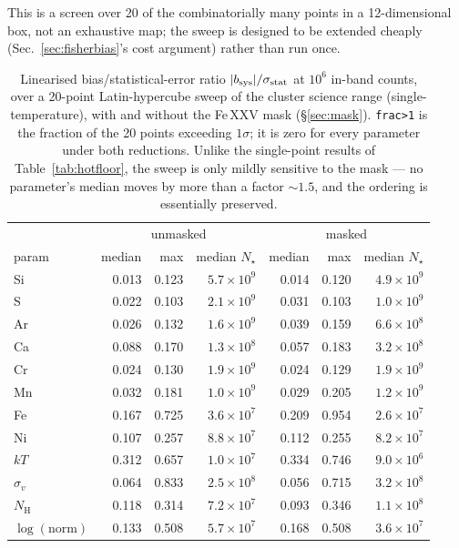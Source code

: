 \documentclass[11pt,a4paper]{article}
\newcommand{\nh}{N_{\mathrm{H}}}
\newcommand{\code}[1]{\texttt{#1}}
\begin{document}
This is a screen over 20 of the combinatorially many points in a 12-dimensional
box, not an exhaustive map; the sweep is designed to be extended cheaply
(Sec.~\ref{sec:fisherbias}'s cost argument) rather than run once.

\begin{table}[t]
\centering
\caption{Linearised bias/statistical-error ratio $|b_{\rm sys}|/\sigma_{\rm
stat}$ at $10^{6}$ in-band counts, over a 20-point Latin-hypercube sweep of
the cluster science range (single-temperature), with and without the Fe\,XXV
mask (\S\ref{sec:mask}). \code{frac>1} is the fraction of the 20 points
exceeding $1\sigma$; it is zero for every parameter under both reductions.
Unlike the single-point results of Table~\ref{tab:hotfloor}, the sweep is only
mildly sensitive to the mask --- no parameter's median moves by more than a
factor ${\sim}1.5$, and the ordering is essentially preserved.}
\label{tab:biassweep}
\begin{tabular}{lrrr|rrr}
\toprule
& \multicolumn{3}{c|}{unmasked} & \multicolumn{3}{c}{masked} \\
param & median & max & median $N_\star$ & median & max & median $N_\star$ \\
\midrule
Si       & 0.013 & 0.123 & $5.7\times10^{9}$ & 0.014 & 0.120 & $4.9\times10^{9}$ \\
S        & 0.022 & 0.103 & $2.1\times10^{9}$ & 0.031 & 0.103 & $1.0\times10^{9}$ \\
Ar       & 0.026 & 0.132 & $1.6\times10^{9}$ & 0.039 & 0.159 & $6.6\times10^{8}$ \\
Ca       & 0.088 & 0.170 & $1.3\times10^{8}$ & 0.057 & 0.183 & $3.2\times10^{8}$ \\
Cr       & 0.024 & 0.130 & $1.9\times10^{9}$ & 0.024 & 0.129 & $1.9\times10^{9}$ \\
Mn       & 0.032 & 0.181 & $1.0\times10^{9}$ & 0.029 & 0.205 & $1.2\times10^{9}$ \\
Fe       & 0.167 & 0.725 & $3.6\times10^{7}$ & 0.209 & 0.954 & $2.6\times10^{7}$ \\
Ni       & 0.107 & 0.257 & $8.8\times10^{7}$ & 0.112 & 0.255 & $8.2\times10^{7}$ \\
$kT$     & 0.312 & 0.657 & $1.0\times10^{7}$ & 0.334 & 0.746 & $9.0\times10^{6}$ \\
$\sigma_v$ & 0.064 & 0.833 & $2.5\times10^{8}$ & 0.056 & 0.715 & $3.2\times10^{8}$ \\
$\nh$    & 0.118 & 0.314 & $7.2\times10^{7}$ & 0.093 & 0.346 & $1.1\times10^{8}$ \\
$\log(\text{norm})$ & 0.133 & 0.508 & $5.7\times10^{7}$ & 0.168 & 0.508 & $3.6\times10^{7}$ \\
\bottomrule
\end{tabular}
\end{table}
\end{document}
